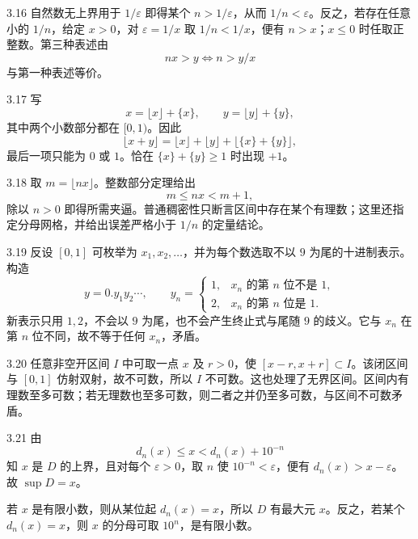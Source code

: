 \begin{solution}{3.16}
自然数无上界用于 \(1/\varepsilon\) 即得某个 \(n>1/\varepsilon\)，从而 \(1/n<\varepsilon\)。反之，若存在任意小的 \(1/n\)，给定 \(x>0\)，对 \(\varepsilon=1/x\) 取 \(1/n<1/x\)，便有 \(n>x\)；\(x\le0\) 时任取正整数。第三种表述由
\[
 nx>y\Longleftrightarrow n>y/x
\]
与第一种表述等价。
\end{solution}

\begin{solution}{3.17}
写
\[
 x=\lfloor x\rfloor+\{x\},\qquad
 y=\lfloor y\rfloor+\{y\},
\]
其中两个小数部分都在 \([0,1)\)。因此
\[
 \lfloor x+y\rfloor
 =\lfloor x\rfloor+\lfloor y\rfloor
 +\lfloor\{x\}+\{y\}\rfloor,
\]
最后一项只能为 \(0\) 或 \(1\)。恰在 \(\{x\}+\{y\}\ge1\) 时出现 \(+1\)。
\end{solution}

\begin{solution}{3.18}
取 \(m=\lfloor nx\rfloor\)。整数部分定理给出
\[
 m\le nx<m+1,
\]
除以 \(n>0\) 即得所需夹逼。普通稠密性只断言区间中存在某个有理数；这里还指定分母网格，并给出误差严格小于 \(1/n\) 的定量结论。
\end{solution}

\begin{solution}{3.19}
反设 \([0,1]\) 可枚举为 \(x_1,x_2,\ldots\)，并为每个数选取不以 \(9\) 为尾的十进制表示。构造
\[
 y=0.y_1y_2\cdots,\qquad
 y_n=
 \begin{cases}
 1,&x_n\text{ 的第 }n\text{ 位不是 }1,\\
 2,&x_n\text{ 的第 }n\text{ 位是 }1.
 \end{cases}
\]
新表示只用 \(1,2\)，不会以 \(9\) 为尾，也不会产生终止式与尾随 \(9\) 的歧义。它与 \(x_n\) 在第 \(n\) 位不同，故不等于任何 \(x_n\)，矛盾。
\end{solution}

\begin{solution}{3.20}
任意非空开区间 \(I\) 中可取一点 \(x\) 及 \(r>0\)，使 \([x-r,x+r]\subset I\)。该闭区间与 \([0,1]\) 仿射双射，故不可数，所以 \(I\) 不可数。这也处理了无界区间。区间内有理数至多可数；若无理数也至多可数，则二者之并仍至多可数，与区间不可数矛盾。
\end{solution}

\begin{solution}{3.21}
由
\[
 d_n(x)\le x<d_n(x)+10^{-n}
\]
知 \(x\) 是 \(D\) 的上界，且对每个 \(\varepsilon>0\)，取 \(n\) 使 \(10^{-n}<\varepsilon\)，便有 \(d_n(x)>x-\varepsilon\)。故 \(\sup D=x\)。

若 \(x\) 是有限小数，则从某位起 \(d_n(x)=x\)，所以 \(D\) 有最大元 \(x\)。反之，若某个 \(d_n(x)=x\)，则 \(x\) 的分母可取 \(10^n\)，是有限小数。
\end{solution}

